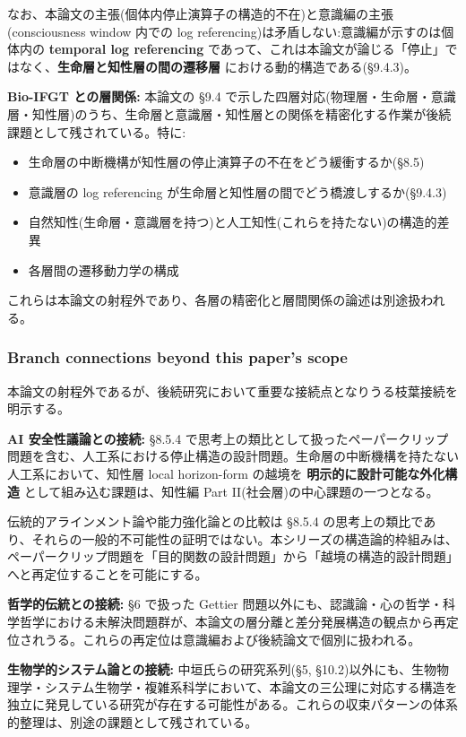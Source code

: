 なお、本論文の主張(個体内停止演算子の構造的不在)と意識編の主張(consciousness window 内での log referencing)は矛盾しない:意識編が示すのは個体内の \textbf{temporal log referencing} であって、これは本論文が論じる「停止」ではなく、\textbf{生命層と知性層の間の遷移層} における動的構造である(\S{}9.4.3)。

\textbf{Bio-IFGT との層関係:}
本論文の \S{}9.4 で示した四層対応(物理層・生命層・意識層・知性層)のうち、生命層と意識層・知性層との関係を精密化する作業が後続課題として残されている。特に:

\begin{itemize}
\item 生命層の中断機構が知性層の停止演算子の不在をどう緩衝するか(\S{}8.5)
\item 意識層の log referencing が生命層と知性層の間でどう橋渡しするか(\S{}9.4.3)
\item 自然知性(生命層・意識層を持つ)と人工知性(これらを持たない)の構造的差異
\item 各層間の遷移動力学の構成
\end{itemize}

これらは本論文の射程外であり、各層の精密化と層間関係の論述は別途扱われる。

\subsubsection{Branch connections beyond this paper's scope}


本論文の射程外であるが、後続研究において重要な接続点となりうる枝葉接続を明示する。

\textbf{AI 安全性議論との接続:}
\S{}8.5.4 で思考上の類比として扱ったペーパークリップ問題を含む、人工系における停止構造の設計問題。生命層の中断機構を持たない人工系において、知性層 local horizon-form の越境を \textbf{明示的に設計可能な外化構造} として組み込む課題は、知性編 Part II(社会層)の中心課題の一つとなる。

伝統的アラインメント論や能力強化論との比較は \S{}8.5.4 の思考上の類比であり、それらの一般的不可能性の証明ではない。本シリーズの構造論的枠組みは、ペーパークリップ問題を「目的関数の設計問題」から「越境の構造的設計問題」へと再定位することを可能にする。

\textbf{哲学的伝統との接続:}
\S{}6 で扱った Gettier 問題以外にも、認識論・心の哲学・科学哲学における未解決問題群が、本論文の層分離と差分発展構造の観点から再定位されうる。これらの再定位は意識編および後続論文で個別に扱われる。

\textbf{生物学的システム論との接続:}
中垣氏らの研究系列(\S{}5, \S{}10.2)以外にも、生物物理学・システム生物学・複雑系科学において、本論文の三公理に対応する構造を独立に発見している研究が存在する可能性がある。これらの収束パターンの体系的整理は、別途の課題として残されている。

